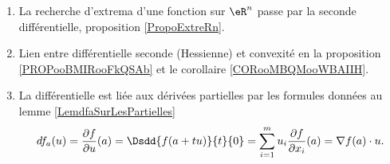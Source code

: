 \begin{enumerate}
    \item
        La recherche d'extrema d'une fonction sur \( \eR^n\) passe par la seconde différentielle, proposition \ref{PropoExtreRn}.
    \item
        Lien entre différentielle seconde (Hessienne) et convexité en la proposition \ref{PROPooBMIRooFkQSAb} et le corollaire \ref{CORooMBQMooWBAIIH}.
    \item
        La différentielle est liée aux dérivées partielles par les formules données au lemme \ref{LemdfaSurLesPartielles}
	\begin{equation}
        df_a(u)=\frac{ \partial f }{ \partial u }(a)=\Dsdd{ f(a+tu) }{t}{0}=\sum_{i=1}^mu_i\frac{ \partial f }{ \partial x_i }(a)=\nabla f(a)\cdot u.
	\end{equation}
\end{enumerate}
